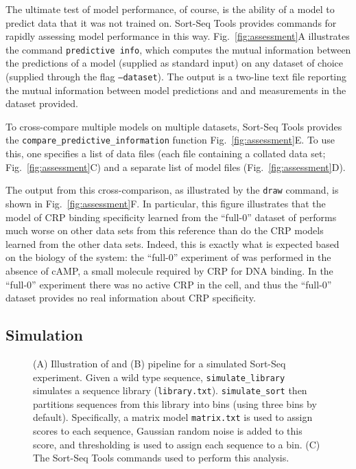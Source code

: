 \documentclass{bmcart}
\newcommand{\fig}[2]{Fig.\ \ref{#1}#2}
\begin{document}
The ultimate test of model performance, of course, is the ability of a model to predict data that it was not trained on. Sort-Seq Tools provides commands for rapidly assessing model performance in this way. \fig{fig:assessment}{A} illustrates the command \texttt{predictive info}, which computes the mutual information between the predictions of a model (supplied as standard input) on any dataset of choice (supplied through the flag \texttt{--dataset}). The output is a two-line text file reporting the mutual information between model predictions and and measurements in the dataset provided. 

To cross-compare multiple models on multiple datasets, Sort-Seq Tools provides the \texttt{compare\_predictive\_information} function \fig{fig:assessment}{E}. To use this, one specifies a list of data files (each file containing a collated data set; \fig{fig:assessment}{C}) and a separate list of model files (\fig{fig:assessment}{D}). 

The output from this cross-comparison, as illustrated by the \texttt{draw} command, is shown in \fig{fig:assessment}{F}. In particular, this figure illustrates that the model of CRP binding specificity learned from the ``full-0'' dataset of \cite{Kinney:2010tn} performs much worse on other data sets from this reference than do the CRP models learned from the other data sets. Indeed, this is exactly what is expected based on the biology of the system: the ``full-0'' experiment of \cite{Kinney:2010tn} was performed in the absence of cAMP, a small molecule required by CRP for DNA binding. In the ``full-0'' experiment there was no active CRP in the cell, and thus the ``full-0'' dataset provides no real information about CRP specificity. 

%
%
\subsection*{Simulation}

%
%
\begin{figure}[h!]
\caption{
(A) Illustration of and (B) pipeline for a simulated Sort-Seq experiment. Given a wild type sequence, \texttt{simulate\_library} simulates a sequence library (\texttt{library.txt}). \texttt{simulate\_sort} then partitions sequences from this library into bins (using three bins by default). Specifically, a matrix model \texttt{matrix.txt} is used to assign scores to each sequence, Gaussian random noise is added to this score, and thresholding is used to assign each sequence to a bin. (C) The Sort-Seq Tools commands used to perform this analysis.  
}
\label{fig:simulation}
\end{figure}
\end{document}
